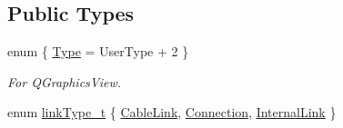 \subsection*{Public Types}
\begin{DoxyCompactItemize}
\item 
enum \{ \hyperlink{classmdt_cl_path_graphics_link_a46597cdad57cbb1d9d5be6dccb671512aa723cdfcf53fb7f9035577f8b91e6651}{Type} = User\-Type + 2
 \}
\begin{DoxyCompactList}\small\item\em For Q\-Graphics\-View. \end{DoxyCompactList}\item 
enum \hyperlink{classmdt_cl_path_graphics_link_a6ac32ab30f4b6193fcd0cd4d3d51ea2d}{link\-Type\-\_\-t} \{ \hyperlink{classmdt_cl_path_graphics_link_a6ac32ab30f4b6193fcd0cd4d3d51ea2da8b0111c49fc77799f8ac81624a5e6c56}{Cable\-Link}, 
\hyperlink{classmdt_cl_path_graphics_link_a6ac32ab30f4b6193fcd0cd4d3d51ea2da8da60a183772ac364b8e845e0f22430d}{Connection}, 
\hyperlink{classmdt_cl_path_graphics_link_a6ac32ab30f4b6193fcd0cd4d3d51ea2da6ea3b5c4de98fe83a1f294bf26b13d8e}{Internal\-Link}
 \}
\end{DoxyCompactItemize}
